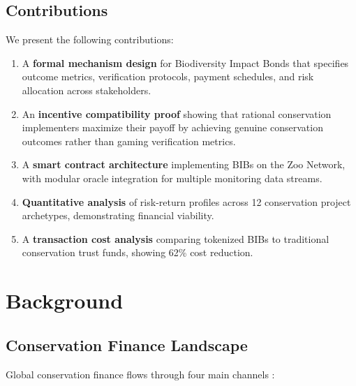 \documentclass[11pt,a4paper]{article}
\begin{document}
\subsection{Contributions}

We present the following contributions:

\begin{enumerate}
  \item A \textbf{formal mechanism design} for Biodiversity Impact Bonds
    that specifies outcome metrics, verification protocols, payment
    schedules, and risk allocation across stakeholders.

  \item An \textbf{incentive compatibility proof} showing that rational
    conservation implementers maximize their payoff by achieving genuine
    conservation outcomes rather than gaming verification metrics.

  \item A \textbf{smart contract architecture} implementing BIBs on the
    Zoo Network, with modular oracle integration for multiple
    monitoring data streams.

  \item \textbf{Quantitative analysis} of risk-return profiles across 12
    conservation project archetypes, demonstrating financial viability.

  \item A \textbf{transaction cost analysis} comparing tokenized BIBs to
    traditional conservation trust funds, showing 62\% cost reduction.
\end{enumerate}


\section{Background}
\label{sec:background}

\subsection{Conservation Finance Landscape}

Global conservation finance flows through four main channels
\citep{deutz2020financing}:
\end{document}
